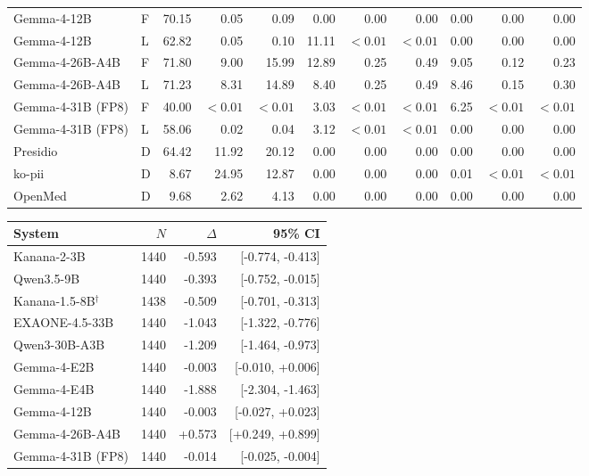 \begin{table}[t]
\begin{tabular*}{\textwidth}{@{\extracolsep{\fill}}llrrrrrrrrr@{}}
Gemma-4-12B & F & 70.15 & 0.05 & 0.09 & 0.00 & 0.00 & 0.00 & 0.00 & 0.00 & 0.00 \\
Gemma-4-12B & L & 62.82 & 0.05 & 0.10 & 11.11 & $<0.01$ & $<0.01$ & 0.00 & 0.00 & 0.00 \\
Gemma-4-26B-A4B & F & 71.80 & 9.00 & 15.99 & 12.89 & 0.25 & 0.49 & 9.05 & 0.12 & 0.23 \\
Gemma-4-26B-A4B & L & 71.23 & 8.31 & 14.89 & 8.40 & 0.25 & 0.49 & 8.46 & 0.15 & 0.30 \\
Gemma-4-31B (FP8) & F & 40.00 & $<0.01$ & $<0.01$ & 3.03 & $<0.01$ & $<0.01$ & 6.25 & $<0.01$ & $<0.01$ \\
Gemma-4-31B (FP8) & L & 58.06 & 0.02 & 0.04 & 3.12 & $<0.01$ & $<0.01$ & 0.00 & 0.00 & 0.00 \\
Presidio & D & 64.42 & 11.92 & 20.12 & 0.00 & 0.00 & 0.00 & 0.00 & 0.00 & 0.00 \\
ko-pii & D & 8.67 & 24.95 & 12.87 & 0.00 & 0.00 & 0.00 & 0.01 & $<0.01$ & $<0.01$ \\
OpenMed & D & 9.68 & 2.62 & 4.13 & 0.00 & 0.00 & 0.00 & 0.00 & 0.00 & 0.00 \\
\bottomrule
\end{tabular*}
\end{table}

\par\medskip
\noindent\begin{minipage}{\columnwidth}
\label{tab:paired-context}
\small
\begin{tabularx}{\columnwidth}{@{}>{\RaggedRight\arraybackslash}Xrrr@{}}
\toprule
System & $N$ & $\Delta$ & 95\% CI \\
\midrule
Kanana-2-3B & 1440 & -0.593 & [-0.774, -0.413] \\
Qwen3.5-9B & 1440 & -0.393 & [-0.752, -0.015] \\
Kanana-1.5-8B$^\dagger$ & 1438 & -0.509 & [-0.701, -0.313] \\
EXAONE-4.5-33B & 1440 & -1.043 & [-1.322, -0.776] \\
Qwen3-30B-A3B & 1440 & -1.209 & [-1.464, -0.973] \\
Gemma-4-E2B & 1440 & -0.003 & [-0.010, +0.006] \\
Gemma-4-E4B & 1440 & -1.888 & [-2.304, -1.463] \\
Gemma-4-12B & 1440 & -0.003 & [-0.027, +0.023] \\
Gemma-4-26B-A4B & 1440 & +0.573 & [+0.249, +0.899] \\
Gemma-4-31B (FP8) & 1440 & -0.014 & [-0.025, -0.004] \\
\bottomrule
\end{tabularx}
\end{minipage}\par\medskip

